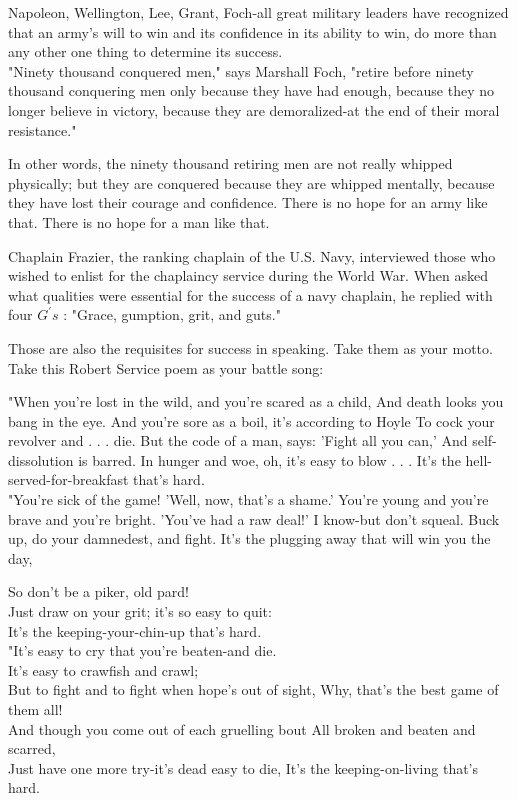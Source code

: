 \documentclass[10pt]{article}
\begin{document}
Napoleon, Wellington, Lee, Grant, Foch-all great military leaders have recognized that an army's will to win and its confidence in its ability to win, do more than any other one thing to determine its success.\\
"Ninety thousand conquered men," says Marshall Foch, "retire before ninety thousand conquering men only because they have had enough, because they no longer believe in victory, because they are demoralized-at the end of their moral resistance."

In other words, the ninety thousand retiring men are not really whipped physically; but they are conquered because they are whipped mentally, because they have lost their courage and confidence. There is no hope for an army like that. There is no hope for a man like that.

Chaplain Frazier, the ranking chaplain of the U.S. Navy, interviewed those who wished to enlist for the chaplaincy service during the World War. When asked what qualities were essential for the success of a navy chaplain, he replied with four $G^{\prime} s$ : "Grace, gumption, grit, and guts."

Those are also the requisites for success in speaking. Take them as your motto. Take this Robert Service poem as your battle song:

\begin{displayquote}
"When you're lost in the wild, and you're scared as a child, And death looks you bang in the eye. And you're sore as a boil, it's according to Hoyle To cock your revolver and . . . die. But the code of a man, says: 'Fight all you can,' And self-dissolution is barred. In hunger and woe, oh, it's easy to blow . . . It's the hell-served-for-breakfast that's hard.\\
"You're sick of the game! 'Well, now, that's a shame.' You're young and you're brave and you're bright. 'You've had a raw deal!' I know-but don't squeal. Buck up, do your damnedest, and fight. It's the plugging away that will win you the day,
\end{displayquote}

So don't be a piker, old pard!\\
Just draw on your grit; it's so easy to quit:\\
It's the keeping-your-chin-up that's hard.\\
"It's easy to cry that you're beaten-and die.\\
It's easy to crawfish and crawl;\\
But to fight and to fight when hope's out of sight, Why, that's the best game of them all!\\
And though you come out of each gruelling bout All broken and beaten and scarred,\\
Just have one more try-it's dead easy to die, It's the keeping-on-living that's hard.
\end{document}
